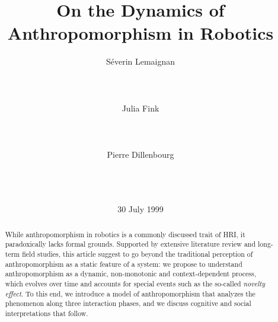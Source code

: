 \documentclass{acm_proc_article-sp}
\begin{document}
\title{On the Dynamics of Anthropomorphism in Robotics
}

\author{
\alignauthor
Séverin Lemaignan\\
    \\
    \\
    \\
\alignauthor
Julia Fink\\
    \\
    \\
    \\
\alignauthor
Pierre Dillenbourg\\
    \\
    \\
    \\
}
\date{30 July 1999}

\maketitle

\begin{abstract}

While anthropomorphism in robotics is a commonly discussed trait of HRI, it
paradoxically lacks formal grounds. Supported by extensive literature review
and long-term field studies, this article suggest to go beyond the traditional
perception of anthropomorphism as a static feature of a system: we propose to
understand anthropomorphism as a dynamic, non-monotonic and context-dependent
process, which evolves over time and accounts for special events such as the
so-called \textit{novelty effect}. To this end, we introduce a model of
anthropomorphism that analyzes the phenomenon along three interaction phases,
and we discuss cognitive and social interpretations that follow.

\end{abstract}

\end{document}
